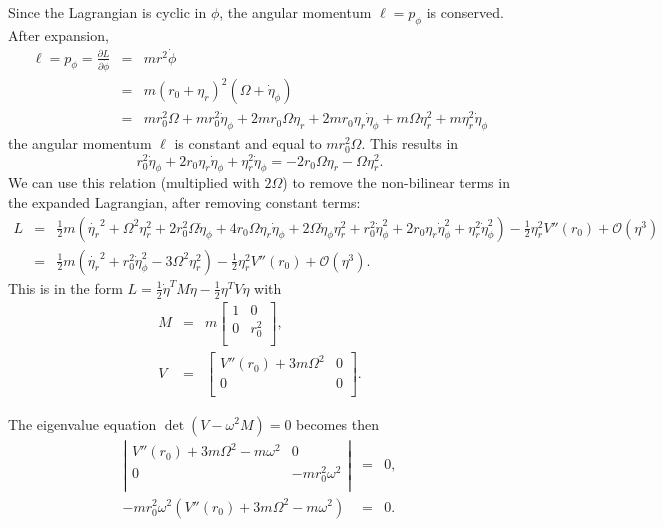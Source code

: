 \documentclass[letterpaper,11pt]{article}
\begin{document}
Since the Lagrangian is cyclic in $\phi$, the angular momentum $\ell = p_\phi$ is conserved.  After expansion,
\begin{eqnarray*}
 \ell = p_\phi = \frac{\partial L}{\partial \dot{\phi}} & = & m r^2 \dot\phi \\
 & = & m (r_0 + \eta_r)^2 (\Omega + \dot\eta_\phi) \\
 & = & m r_0^2 \Omega + m r_0^2 \dot\eta_\phi + 2 m r_0 \Omega \eta_r + 2 m r_0 \eta_r \dot\eta_\phi + m \Omega \eta_r^2 + m \eta_r^2 \dot\eta_\phi
\end{eqnarray*}
the angular momentum $\ell$ is constant and equal to $m r_0^2 \Omega$.  This results in
\begin{equation*}
 r_0^2 \dot\eta_\phi + 2 r_0 \eta_r \dot\eta_\phi + \eta_r^2 \dot\eta_\phi = - 2 r_0 \Omega \eta_r - \Omega \eta_r^2.
\end{equation*}
We can use this relation (multiplied with $2 \Omega$) to remove the non-bilinear terms in the expanded Lagrangian, after removing constant terms:
\begin{eqnarray*}
 L & = & \frac{1}{2} m \left(\dot{\eta_r}^2 + \Omega^2 \eta_r^2 + 2 r_0^2 \Omega \dot\eta_\phi + 4 r_0 \Omega \eta_r \dot\eta_\phi + 2 \Omega \dot\eta_\phi \eta_r^2 + r_0^2 \dot\eta_\phi^2  + 2 r_0 \eta_r \dot\eta_\phi^2 + \eta_r^2 \dot\eta_\phi^2\right) - \frac{1}{2} \eta_r^2 V''(r_0) + \mathcal{O}(\eta^3) \\
   & = & \frac{1}{2} m \left(\dot{\eta_r}^2 + r_0^2 \dot\eta_\phi^2 - 3 \Omega^2 \eta_r^2\right) - \frac{1}{2} \eta_r^2 V''(r_0) + \mathcal{O}(\eta^3).
\end{eqnarray*}
This is in the form $L = \frac{1}{2} \dot\eta^T M \dot\eta - \frac{1}{2} \eta^T V \eta$ with
\begin{eqnarray*}
 M & = & m \left[
  \begin{array}{cc}
   1 & 0 \\
   0 & r_0^2 \\
  \end{array} \right], \\
 V & = & \left[
  \begin{array}{cc}
   V''(r_0) + 3 m \Omega^2 & 0 \\
   0 & 0 \\
  \end{array} \right].
\end{eqnarray*}

The eigenvalue equation $\det(V - \omega^2 M) = 0$ becomes then
\begin{eqnarray*}
 \left|   \begin{array}{cc}
   V''(r_0) + 3 m \Omega^2 - m \omega^2 & 0 \\
   0 & -m r_0^2 \omega^2 \\
 \end{array} \right| & = & 0, \\
 -m r_0^2 \omega^2 \left(V''(r_0) + 3 m \Omega^2 - m \omega^2 \right) & = & 0.
\end{eqnarray*}
\end{document}
